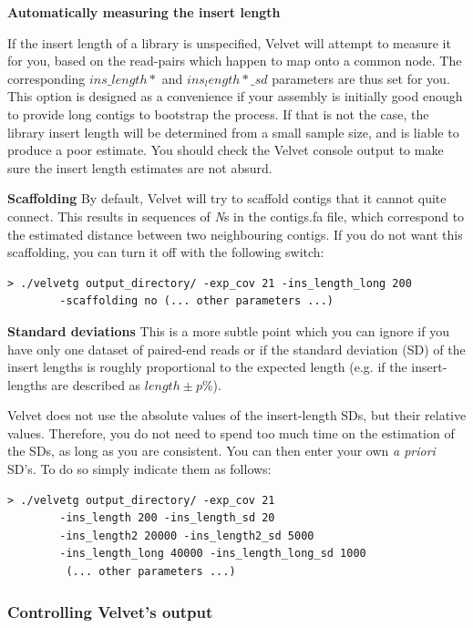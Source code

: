 \documentclass{article}
\begin{document}
\textbf{Automatically measuring the insert length} 

If the insert length of a library is unspecified, Velvet will attempt to measure it for you, based on the read-pairs which happen to map onto a common node. The corresponding $ins\_length*$ and $ins_length*\_sd$ parameters are thus set for you. This option is designed as a convenience if your assembly is initially good enough to provide long contigs to bootstrap the process. If that is not the case, the library insert length will be determined from a small sample size, and is liable to produce a poor estimate. You should check the Velvet console output to make sure the insert length estimates are not absurd.

\textbf{Scaffolding} By default, Velvet will try to scaffold contigs that it cannot quite connect. This results in sequences of \emph{N}s in the contigs.fa file, which correspond to the estimated distance between two neighbouring contigs. If you do not want this scaffolding, you can turn it off with the following switch:

\begin{verbatim}
> ./velvetg output_directory/ -exp_cov 21 -ins_length_long 200
		-scaffolding no (... other parameters ...)
\end{verbatim}

\textbf{Standard deviations} This is a more subtle point which you can ignore if you have only one dataset of paired-end reads or if the standard deviation (SD) of the insert lengths is roughly proportional to the expected length (e.g. if the insert-lengths are described as $length \pm p\%$).

Velvet does not use the absolute values of the insert-length SDs, but their relative values. Therefore, you do not need to spend too much time on the estimation of the SDs, as long as you are consistent. You can then enter your own \emph{a priori} SD's. To do so simply indicate them as follows:

\begin{verbatim}
> ./velvetg output_directory/ -exp_cov 21 
		-ins_length 200 -ins_length_sd 20
		-ins_length2 20000 -ins_length2_sd 5000
		-ins_length_long 40000 -ins_length_long_sd 1000
		 (... other parameters ...)
\end{verbatim}

	\subsubsection{Controlling Velvet's output}
\end{document}
